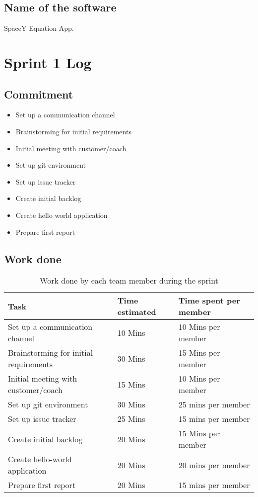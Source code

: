 \documentclass[14]{article}
\begin{document}
\subsection{Name of the software}
SpaceY Equation App.
\section{Sprint 1 Log}
\subsection{Commitment}
\begin{itemize}
    \item Set up a communication channel
    \item Brainstorming for initial requirements
    \item Initial meeting with customer/coach
    \item Set up git environment
    \item Set up issue tracker
    \item Create initial backlog
    \item Create hello world application
    \item Prepare first report
\end{itemize}
\subsection{Work done}
\begin{table}[H]
    \centering
    \begin{tabular}{l|l|l|}
        \textbf{Task} & \textbf{Time estimated} & \textbf{Time spent per member}  \\
        \hline
        Set up a communication channel & 10 Mins & 10 Mins per member \\
        Brainstorming for initial requirements & 30 Mins & 15 Mins per member\\
        Initial meeting with customer/coach & 15 Mins & 10 Mins per member \\
        Set up git environment & 30 Mins & 25 mins per member \\
        Set up issue tracker & 25 Mins & 15 mins per member \\
        Create initial backlog & 20 Mins & 15 Mins per member \\
        Create hello-world application & 20 Mins & 20 mins per member  \\
        Prepare first report & 20 Mins & 15 mins per member \\
    \end{tabular}
    \caption{Work done by each team member during the sprint}
    \label{tab:my_label}
\end{table}
\end{document}
